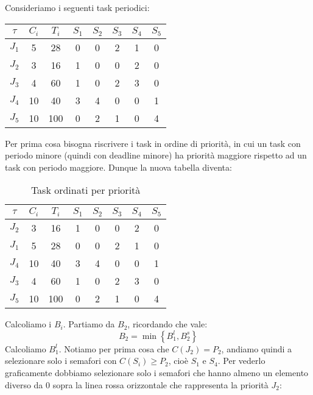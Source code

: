\begin{Esercizio2}

Consideriamo i seguenti task periodici:

\begin{table}[h]
\centering
\begin{tabular}{|c|c|c|c|c|c|c|c|}
\hline
\(\tau\) & $C_i$ & $T_i$ & $S_1$ & $S_2$ & $S_3$ & $S_4$ & $S_5$ \\
\hline
$J_1$ & 5 & 28 & 0 & 0 & 2 & 1 & 0 \\
\hline
$J_2$ & 3 & 16 & 1 & 0 & 0 & 2 & 0 \\
\hline
$J_3$ & 4 & 60 & 1 & 0 & 2 & 3 & 0 \\
\hline
$J_4$ & 10 & 40 & 3 & 4 & 0 & 0 & 1 \\
\hline
$J_5$ & 10 & 100 & 0 & 2 & 1 & 0 & 4 \\
\hline
\end{tabular}
\label{tab:task_periodici_esercizio}
\end{table}

Per prima cosa bisogna riscrivere i task in ordine di priorità,
in cui un task con periodo minore (quindi con deadline minore)
ha priorità maggiore rispetto ad un task con periodo maggiore.
Dunque la nuova tabella diventa:

\begin{table}[h]
\centering
\caption{Task ordinati per priorità}
\begin{tabular}{|c|c|c|c|c|c|c|c|}
\hline
\(\tau\) & $C_i$ & $T_i$ & $S_1$ & $S_2$ & $S_3$ & $S_4$ & $S_5$ \\
\hline
$J_2$ & 3 & 16 & 1 & 0 & 0 & 2 & 0 \\
\hline
$J_1$ & 5 & 28 & 0 & 0 & 2 & 1 & 0 \\
\hline
$J_4$ & 10 & 40 & 3 & 4 & 0 & 0 & 1 \\
\hline
$J_3$ & 4 & 60 & 1 & 0 & 2 & 3 & 0 \\
\hline
$J_5$ & 10 & 100 & 0 & 2 & 1 & 0 & 4 \\
\hline
\end{tabular}
\label{tab:task_periodici_esercizio}
\end{table}

Calcoliamo i \(B_i\). Partiamo da \(B_2\),
ricordando che vale:
\[ B_2 = \min \left\{B_{1}^{l} , B_{2}^{s}\right\} \]
Calcoliamo \(B_{1}^{l}\).
Notiamo per prima cosa che \(C(J_{2}) = P_{2}\),
andiamo quindi a selezionare solo i semafori 
con \(C(S_{i}) \ge P_{2}\), cioè \(S_1\) e \(S_4\).
Per vederlo graficamente dobbiamo selezionare solo 
i semafori che hanno almeno un elemento diverso da 0 
sopra la linea rossa orizzontale che rappresenta la priorità
\(J_{2}\):


\end{Esercizio2}
